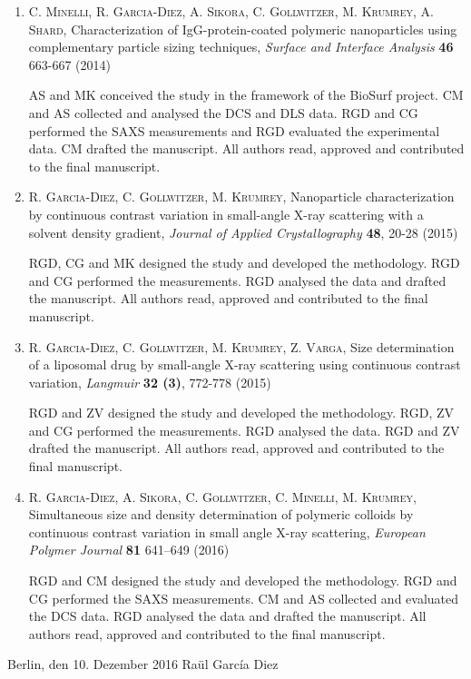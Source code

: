\begin{enumerate}

    \item \textsc{C. Minelli, R. Garcia-Diez, A. Sikora, C. Gollwitzer, M. Krumrey, A. Shard}, Characterization of IgG-protein-coated polymeric nanoparticles using complementary particle sizing techniques, \emph{Surface and Interface Analysis} \textbf{46} 663-667 (2014)

        \hspace{10pt} AS and MK conceived the study in the framework of the BioSurf project. CM and AS collected and analysed the DCS and DLS data. RGD and CG performed the SAXS measurements and RGD evaluated the experimental data. CM drafted the manuscript. All authors read, approved and contributed to the final manuscript.

    \item \textsc{R. Garcia-Diez, C. Gollwitzer, M. Krumrey}, Nanoparticle characterization by continuous contrast variation in small-angle {{X}}-ray scattering with a solvent density gradient, \emph{Journal of Applied Crystallography} \textbf{48}, 20-28 (2015)

        \hspace{10pt} RGD, CG and MK designed the study and developed the methodology. RGD and CG performed the measurements. RGD analysed the data and drafted the manuscript. All authors read, approved and contributed to the final manuscript.

    \item \textsc{R. Garcia-Diez, C. Gollwitzer, M. Krumrey, Z. Varga}, Size determination of a liposomal drug by small-angle X-ray scattering using continuous contrast variation, \emph{Langmuir} \textbf{32 (3)}, 772-778 (2015)

        \hspace{10pt} RGD and ZV designed the study and developed the methodology. RGD, ZV and CG performed the measurements. RGD analysed the data. RGD and ZV drafted the manuscript. All authors read, approved and contributed to the final manuscript.
        
    \item \textsc{R. Garcia-Diez, A. Sikora, C. Gollwitzer, C. Minelli, M. Krumrey}, Simultaneous size and density determination of polymeric colloids by continuous contrast variation in small angle {{X}}-ray scattering, \emph{European Polymer Journal} \textbf{81} 641–649 (2016) 

        \hspace{10pt} RGD and CM designed the study and developed the methodology. RGD and CG performed the SAXS measurements. CM and AS collected and evaluated the DCS data. RGD analysed the data and drafted the manuscript. All authors read, approved and contributed to the final manuscript.

\end{enumerate}

\vspace{3cm}

\noindent Berlin, den 10. Dezember 2016 \hfill Raül Garc\'{i}a Diez

\cleardoublepage
